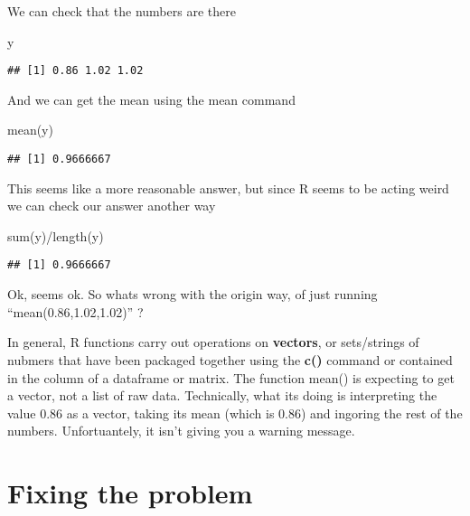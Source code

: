 \documentclass[
]{book}
\newenvironment{Shaded}{\begin{snugshade}}{\end{snugshade}}
\newcommand{\FunctionTok}[1]{\textcolor[rgb]{0.00,0.00,0.00}{#1}}
\newcommand{\NormalTok}[1]{#1}
\newcommand{\SpecialCharTok}[1]{\textcolor[rgb]{0.00,0.00,0.00}{#1}}
\begin{document}
We can check that the numbers are there

\begin{Shaded}
\begin{Highlighting}[]
\NormalTok{y}
\end{Highlighting}
\end{Shaded}

\begin{verbatim}
## [1] 0.86 1.02 1.02
\end{verbatim}

And we can get the mean using the mean command

\begin{Shaded}
\begin{Highlighting}[]
\FunctionTok{mean}\NormalTok{(y)}
\end{Highlighting}
\end{Shaded}

\begin{verbatim}
## [1] 0.9666667
\end{verbatim}

This seems like a more reasonable answer, but since R seems to be acting weird we can check our answer another way

\begin{Shaded}
\begin{Highlighting}[]
\FunctionTok{sum}\NormalTok{(y)}\SpecialCharTok{/}\FunctionTok{length}\NormalTok{(y)}
\end{Highlighting}
\end{Shaded}

\begin{verbatim}
## [1] 0.9666667
\end{verbatim}

Ok, seems ok. So whats wrong with the origin way, of just running ``mean(0.86,1.02,1.02)'' ?

In general, R functions carry out operations on \textbf{vectors}, or sets/strings of nubmers that have been packaged together using the \textbf{c()} command or contained in the column of a dataframe or matrix. The function mean() is expecting to get a vector, not a list of raw data. Technically, what its doing is interpreting the value 0.86 as a vector, taking its mean (which is 0.86) and ingoring the rest of the numbers. Unfortuantely, it isn't giving you a warning message.

\hypertarget{fixing-the-problem}{%
\section{Fixing the problem}\label{fixing-the-problem}}
\end{document}
